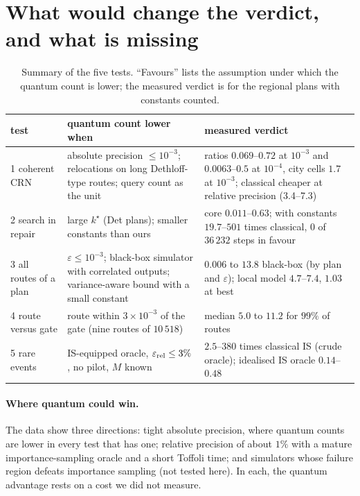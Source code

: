 \documentclass[pdflatex,sn-mathphys-num]{sn-jnl}
\theoremstyle{thmstyleone}
\theoremstyle{thmstyletwo}
\begin{document}
\section{What would change the verdict, and what is missing}\label{sec:limits}

\begin{table}[t]
\caption{Summary of the five tests. ``Favours'' lists the assumption under which the quantum count is lower; the measured verdict is for the regional plans with constants counted.}\label{tab:summary}
\begin{tabular}{@{}p{}p{}p{}@{}}
\toprule
test & quantum count lower when & measured verdict \\
\midrule
1 coherent CRN & absolute precision $\le10^{-3}$; relocations on long Dethloff-type routes; query count as the unit & ratios $0.069$--$0.72$ at $10^{-3}$ and $0.0063$--$0.5$ at $10^{-4}$, city cells $1.7$ at $10^{-3}$; classical cheaper at relative precision (3.4--7.3) \\
2 search in repair & large $k^\star$ (Det plans); smaller constants than ours & core $0.011$--$0.63$; with constants $19.7$--$501$ times classical, $0$ of $36\,232$ steps in favour \\
3 all routes of a plan & $\varepsilon\le10^{-3}$; black-box simulator with correlated outputs; variance-aware bound with a small constant & $0.006$ to $13.8$ black-box (by plan and $\varepsilon$); local model $4.7$--$7.4$, $1.03$ at best \\
4 route versus gate & route within $3\times10^{-3}$ of the gate (nine routes of $10\,518$) & median $5.0$ to $11.2$ for $99\%$ of routes \\
5 rare events & IS-equipped oracle, $\varepsilon_{\rm rel}\le3\%$, no pilot, $M$ known & $2.5$--$380$ times classical IS (crude oracle); idealised IS oracle $0.14$--$0.48$ \\
\bottomrule
\end{tabular}
\end{table}

\paragraph{Where quantum could win.} The data show three directions: tight absolute precision, where quantum counts are lower in every test that has one; relative precision of about $1\%$ with a mature importance-sampling oracle and a short Toffoli time; and simulators whose failure region defeats importance sampling (not tested here). In each, the quantum advantage rests on a cost we did not measure.
\end{document}
